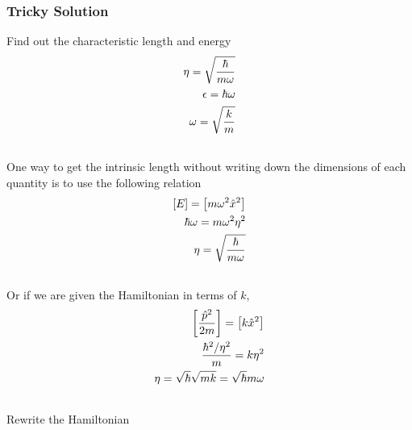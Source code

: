 \documentclass[letterpaper,10pt,english]{sphinxmanual}
\begin{document}
\subsubsection{Tricky Solution}
\label{QuantumMechanics:tricky-solution}
Find out the characteristic length and energy
\begin{gather}
\begin{split}\eta = \sqrt{\frac{\hbar }{m\omega }} \\
\epsilon = \hbar \omega \\
\omega = \sqrt{\frac{k}{m}}\end{split}\notag\\\begin{split}\end{split}\notag
\end{gather}
One way to get the intrinsic length without writing down the dimensions of each quantity is to use the following relation
\begin{gather}
\begin{split}\left[ E \right] = \left[ m \omega^2 \hat x^2 \right] \\
\hbar \omega = m \omega^2 \eta^2 \\\
\eta = \sqrt{ \frac{\hbar}{m\omega} }\end{split}\notag\\\begin{split}\end{split}\notag
\end{gather}
Or if we are given the Hamiltonian in terms of $k$,
\begin{gather}
\begin{split}\left[ \frac{\hat p^2}{2m} \right] = \left[ k \hat x^2 \right] \\
\frac{\hbar^2 / \eta^2 }{m} = k\eta^2 \\
\eta = \sqrt{\hbar}{ \sqrt{m k} } = \sqrt{ \hbar }{ m \omega }\end{split}\notag\\\begin{split}\end{split}\notag
\end{gather}
Rewrite the Hamiltonian
\end{document}
